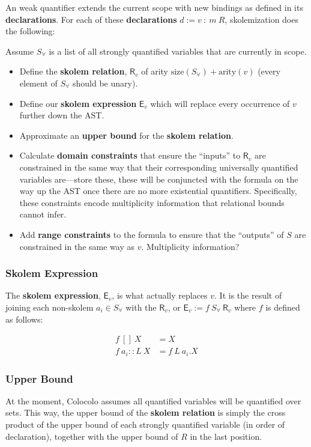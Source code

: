 \documentclass[10pt]{article}
\theoremstyle{definition}
\begin{document}
  An weak quantifier extends the current scope with new bindings as defined in its \textbf{declarations}. For each of these \textbf{declarations} $d := v~:~m~R$, skolemization does the following:

  Assume $S_\forall$ is a list of all strongly quantified variables that are currently in scope.

  \begin{itemize}
      \item Define the \textbf{skolem relation}, $\textsf{R}_v$ of arity $\text{size}(S_\forall) + \text{arity}(v)$ (every element of $S_\forall$ should be unary).
      \item Define our \textbf{skolem expression} $\textsf{E}_v$ which will replace every occurrence of $v$ further down the AST.
      \item Approximate an \textbf{upper bound} for the \textbf{skolem relation}.
      \item Calculate \textbf{domain constraints} that ensure the ``inputs'' to $\textsf{R}_v$ are constrained in the same way that their corresponding universally quantified variables are---store these, these will be conjuncted with the formula on the way up the AST once there are no more existential quantifiers. Specifically, these constraints encode multiplicity information that relational bounds cannot infer.
      \item Add \textbf{range constraints} to the formula to ensure that the ``outputs'' of $S$ are constrained in the same way as $v$. Multiplicity information?
  \end{itemize}

  \subsubsection*{Skolem Expression}

  The \textbf{skolem expression}, $\textsf{E}_v$, is what actually replaces $v$. It is the result of joining each non-skolem $a_i \in S_\forall$ with the $\textsf{R}_v$, or $\textsf{E}_v := f~S_\forall~\textsf{R}_v$ where $f$ is defined as follows:
  
  \begin{align*}
      f~[]~X& = X\\
      f~a_i::L~X& = f~L~a_i.X
  \end{align*}

  \subsubsection*{Upper Bound}
  At the moment, Colocolo assumes all quantified variables will be quantified over sets. This way, the upper bound of the \textbf{skolem relation} is simply the cross product of the upper bound of each strongly quantified variable (in order of declaration), together with the upper bound of $R$ in the last position.
\end{document}

